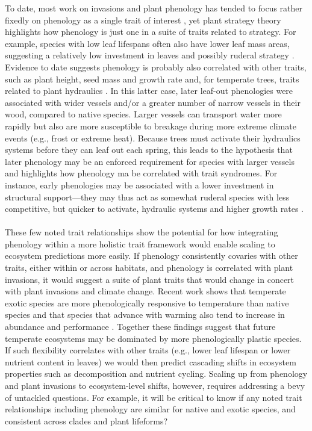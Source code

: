 \documentclass[11pt,a4paper,oneside]{article}
\begin{document}
To date, most work on invasions and plant phenology has tended to focus rather fixedly on phenology as a single trait of interest \citep[but see][]{Sun:2011eu,hahn2012}, yet plant strategy theory \citep{crainebook} highlights how phenology is just one in a suite of traits related to strategy. For example, species with low leaf lifespans often also have lower leaf mass areas, suggesting a relatively low investment in leaves and possibly ruderal strategy \citep{Mack:1996ly}. Evidence to date suggests phenology is probably also correlated with other traits, such as plant height, seed mass \citep{Bolmgren:2008vo} and growth rate \citep{Sun:2011eu} and, for temperate trees, traits related to plant hydraulics \citep{Lechowicz:1984cr}. In this latter case, later leaf-out phenologies were associated with wider vessels and/or a greater number of narrow vessels in their wood, compared to native species. Larger vessels can transport water more rapidly but also are more susceptible to breakage during more extreme climate events (e.g., frost or extreme heat). Because trees must activate their hydraulics systems before they can leaf out each spring, this leads to the hypothesis \citep{Lechowicz:1984cr}
that later phenology may be an enforced requirement for species with larger vessels and highlights how phenology ma be correlated with trait syndromes. For instance, early phenologies may be associated with a lower investment in structural support---they may thus act as somewhat ruderal species with less competitive, but quicker to activate, hydraulic systems \citep{Lechowicz:1984cr} and higher growth rates \citep{Sun:2011eu,hahn2012}.\\
\\
These few noted trait relationships show the potential for how integrating phenology within a more holistic trait framework would enable scaling to ecosystem predictions more easily. If phenology consistently covaries with other traits, either within or across habitats, and phenology is correlated with plant invasions, it would suggest a suite of plant traits that would change in concert with plant invasions and climate change. Recent work shows that temperate exotic species are more phenologically responsive to temperature than native species and that species that advance with warming also tend to increase in abundance and performance \citep{Cleland:2012vn}. Together these findings suggest that future temperate ecosystems may be dominated by more phenologically plastic species. If such flexibility correlates with other traits (e.g., lower leaf lifespan or lower nutrient content in leaves) we would then predict cascading shifts in ecosystem properties such as decomposition and nutrient cycling. Scaling up from phenology and plant invasions to ecosystem-level shifts, however, requires addressing a bevy of untackled questions. For example, it will be critical to know if any noted trait relationships including phenology are similar for native and exotic species, and consistent across clades and plant lifeforms? \\
\end{document}
